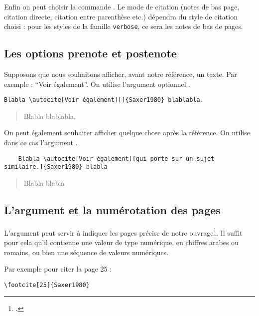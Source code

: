 Enfin on peut choisir la commande . Le mode de citation (notes de bas page, citation directe, citation entre parenthèse etc.) dépendra du style de citation choisi : pour les styles de la famille \verb|verbose|, ce sera les notes de bas de pages. 

\subsection{Les options prenote et postenote}

Supposons que nous souhaitons afficher, avant notre référence, un texte. Par exemple : \enquote{Voir également}. On utilise l'argument optionnel .

\begin{verbatim}
Blabla \autocite[Voir également][]{Saxer1980} blablabla.
\end{verbatim}

\begin{quotation}
Blabla \parencite[Voir également][]{Saxer1980} blablabla.
\end{quotation}



On peut également souhaiter afficher quelque chose après la référence. On utilise dans ce cas l'argument .

\begin{verbatim}
	Blabla \autocite[Voir également][qui porte sur un sujet similaire.]{Saxer1980} blabla
\end{verbatim}

\begin{quotation}

	Blabla \parencite[Voir également][qui porte sur un sujet similaire.]{Saxer1980} blabla
\end{quotation}

\subsection{L'argument  et la numérotation des pages}

L'argument  peut servir à indiquer les pages précise de notre ouvrage\footcite[On consultera pour plus de détails : ][]{biblatex_pages}. Il suffit pour cela qu'il contienne une valeur de type numérique, en chiffres arabes ou romains, ou bien une séquence de valeurs numériques.

Par exemple pour citer la page 25 : 
\begin{verbatim}
\footcite[25]{Saxer1980}
\end{verbatim}

